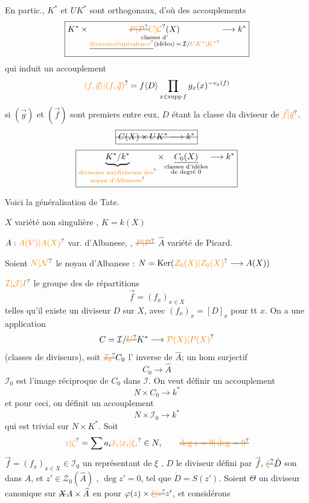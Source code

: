 En partic., $K^*$ et $UK^*$ sont orthogonaux, d'où des accouplements
\[
\boxed{K^*\times\underset{\substack{\text{classes d'}\\\deleted{\text{\unsure{diviseurs|équivalence}}}\inserted{\text{idèles}}\,=\,\mathcal I/\unsure{UK^*|K^*}}}{\deleted{\unsure{P|\mathcal P}}\unsure{C|\mathcal C}(X)}\longrightarrow k^*}
\]
qui induit un accouplement
\[
\unsure{\langle f,\vec g\rangle|(f,\vec g)}=f\langle D\rangle\prod_{x\in\operatorname{supp}f}g_x(x)^{-v_x(f)}
\]
si $(\vec g)$ et $(\vec f)$ sont premiers entre eux, $D$ étant la classe du diviseur de $\unsure{\vec f|\vec g}$.
\[
\deleted{\boxed{C(X)\times UK^*\longrightarrow k^*}}
\]
\[
\boxed{\underbrace{K^*/k^*}_{\substack{\text{\unsure{diviseurs au|diviseurs des}}\\\text{\unsure{noyau d\textquotesingle Albanese}}}}\times\underset{\substack{\text{classes d'idèles}\\\text{de degré }0}}{\underline{C_0(X)}}\longrightarrow k^*}
\]

Voici la généralisation de Tate.

$X$ variété non singulière , $K=k(X)$

$A:\unsure{A(V)|A(X)}$ var. d'Albanese, , $\deleted{\unsure{P|\mathcal P}}$ $\widehat A$ variété de Picard.

Soient $\unsure{N|\mathcal N}$ le noyau d'Albanese : $N=\operatorname{Ker}(\unsure{\mathcal Z_0(X)|Z_0(X)}\longrightarrow A(X))$


$\unsure{\mathcal I|\mathcal J|I}$ le groupe des  de répartitions
\[
\vec f=(f_x)_{x\in X}
\]
telles qu'il existe un diviseur $D$ sur $X$, avec $(f_x)_x=[D]_x$ pour tt $x$. On a une application
\[
C=\mathcal I/\deleted{\unsure{U}}K^*\longrightarrow\unsure{\mathcal P(X)|P(X)}
\]
(classes de diviseurs), soit $\deleted{\unsure{\mathcal I_0}}C_0$ l' inverse de $\widehat A$;  un hom surjectif
\[
C_0\longrightarrow\widehat A
\]
$\mathcal I_0$ est l'image réciproque de $C_0$ dans $\mathcal I$.
On veut définir un accouplement
\[
N\times C_0\longrightarrow k^*
\]
et pour ceci, on définit un accouplement
\[
N\times\mathcal I_0\longrightarrow k^*
\]
qui est trivial sur $N\times K^*$. Soit
\[
\unsure{z|\zeta}=\sum a_i\unsure{\tilde x_i|x_i|\xi_i}\in N,\qquad\deleted{\unsure{\deg z=0|\deg=0}}
\]
 $\vec f=(f_x)_{x\in X}\in\mathcal I_0$ un représentant de $\xi$ ,
$D$ le diviseur défini par $\vec f$, $\deleted{\unsure{\xi}}\dot D$ son  dans $\widehat A$, et $z'\in\mathcal Z_0(\widehat A)$ , $\deg z'=0$, tel que $\dot D=S(z')$.
Soient $\Theta$ un diviseur canonique sur $\deleted{X}A\times\widehat A$ en  pour $\varphi(z)\times\deleted{\unsure{\xi|z}}z'$, et considérons

